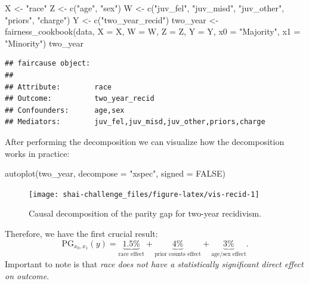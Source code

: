 \documentclass{article}
\newenvironment{Shaded}{\begin{snugshade}}{\end{snugshade}}
\newcommand{\AttributeTok}[1]{\textcolor[rgb]{0.77,0.63,0.00}{#1}}
\newcommand{\ConstantTok}[1]{\textcolor[rgb]{0.00,0.00,0.00}{#1}}
\newcommand{\FunctionTok}[1]{\textcolor[rgb]{0.00,0.00,0.00}{#1}}
\newcommand{\NormalTok}[1]{#1}
\newcommand{\OtherTok}[1]{\textcolor[rgb]{0.56,0.35,0.01}{#1}}
\newcommand{\StringTok}[1]{\textcolor[rgb]{0.31,0.60,0.02}{#1}}
\begin{document}
\begin{Shaded}
\begin{Highlighting}[]
\NormalTok{X }\OtherTok{\textless{}{-}} \StringTok{"race"}
\NormalTok{Z }\OtherTok{\textless{}{-}} \FunctionTok{c}\NormalTok{(}\StringTok{"age"}\NormalTok{, }\StringTok{"sex"}\NormalTok{)}
\NormalTok{W }\OtherTok{\textless{}{-}} \FunctionTok{c}\NormalTok{(}\StringTok{"juv\_fel"}\NormalTok{, }\StringTok{"juv\_misd"}\NormalTok{, }\StringTok{"juv\_other"}\NormalTok{, }\StringTok{"priors"}\NormalTok{, }\StringTok{"charge"}\NormalTok{)}
\NormalTok{Y }\OtherTok{\textless{}{-}} \FunctionTok{c}\NormalTok{(}\StringTok{"two\_year\_recid"}\NormalTok{)}
\NormalTok{two\_year }\OtherTok{\textless{}{-}} \FunctionTok{fairness\_cookbook}\NormalTok{(data, }\AttributeTok{X =}\NormalTok{ X, }\AttributeTok{W =}\NormalTok{ W, }\AttributeTok{Z =}\NormalTok{ Z, }\AttributeTok{Y =}\NormalTok{ Y, }
                              \AttributeTok{x0 =} \StringTok{"Majority"}\NormalTok{, }\AttributeTok{x1 =} \StringTok{"Minority"}\NormalTok{)}
\NormalTok{two\_year}
\end{Highlighting}
\end{Shaded}

\begin{verbatim}
## faircause object:
## 
## Attribute:        race 
## Outcome:          two_year_recid 
## Confounders:      age,sex 
## Mediators:        juv_fel,juv_misd,juv_other,priors,charge
\end{verbatim}

After performing the decomposition we can visualize how the
decomposition works in practice:

\begin{Shaded}
\begin{Highlighting}[]
\FunctionTok{autoplot}\NormalTok{(two\_year, }\AttributeTok{decompose =} \StringTok{"xspec"}\NormalTok{, }\AttributeTok{signed =} \ConstantTok{FALSE}\NormalTok{)}
\end{Highlighting}
\end{Shaded}

\begin{figure}

{\centering \texttt{[image: shai-challenge\_files/figure-latex/vis-recid-1]} 

}

\caption{Causal decomposition of the parity gap for two-year recidivism.}\label{fig:vis-recid}
\end{figure}

Therefore, we have the first crucial result: \begin{equation}
  \text{PG}_{x_0, x_1}(y) = \underbrace{1.5\%}_{\text{race effect}} +  \underbrace{4\%}_{\text{prior counts effect}} +  \underbrace{3\%}_{\text{age/sex effect}}.
\end{equation} Important to note is that \emph{race does not have a
statistically significant direct effect on outcome}.
\end{document}
